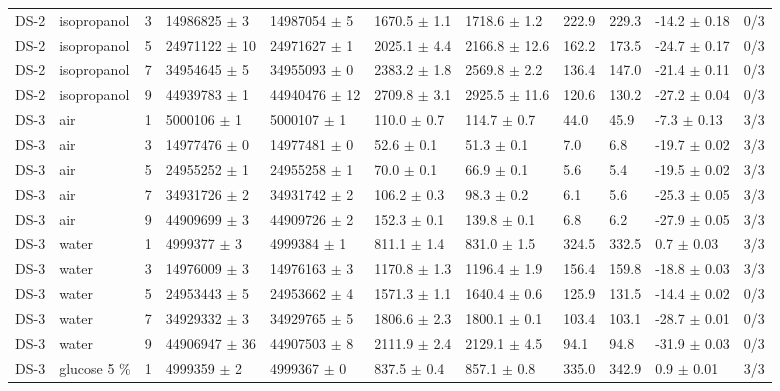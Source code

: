 \documentclass[11pt,a4paper]{article}
\begin{document}
\begin{landscape}
{\begin{longtable}{@{}lllllllllll@{}}
DS-2 & isopropanol & 3 & 14986825 $\pm$ 3 & 14987054 $\pm$ 5 & 1670.5 $\pm$ 1.1 & 1718.6 $\pm$ 1.2 & 222.9 & 229.3 & -14.2 $\pm$ 0.18 & 0/3 \\
DS-2 & isopropanol & 5 & 24971122 $\pm$ 10 & 24971627 $\pm$ 1 & 2025.1 $\pm$ 4.4 & 2166.8 $\pm$ 12.6 & 162.2 & 173.5 & -24.7 $\pm$ 0.17 & 0/3 \\
DS-2 & isopropanol & 7 & 34954645 $\pm$ 5 & 34955093 $\pm$ 0 & 2383.2 $\pm$ 1.8 & 2569.8 $\pm$ 2.2 & 136.4 & 147.0 & -21.4 $\pm$ 0.11 & 0/3 \\
DS-2 & isopropanol & 9 & 44939783 $\pm$ 1 & 44940476 $\pm$ 12 & 2709.8 $\pm$ 3.1 & 2925.5 $\pm$ 11.6 & 120.6 & 130.2 & -27.2 $\pm$ 0.04 & 0/3 \\
DS-3 & air & 1 & 5000106 $\pm$ 1 & 5000107 $\pm$ 1 & 110.0 $\pm$ 0.7 & 114.7 $\pm$ 0.7 & 44.0 & 45.9 & -7.3 $\pm$ 0.13 & 3/3 \\
DS-3 & air & 3 & 14977476 $\pm$ 0 & 14977481 $\pm$ 0 & 52.6 $\pm$ 0.1 & 51.3 $\pm$ 0.1 & 7.0 & 6.8 & -19.7 $\pm$ 0.02 & 3/3 \\
DS-3 & air & 5 & 24955252 $\pm$ 1 & 24955258 $\pm$ 1 & 70.0 $\pm$ 0.1 & 66.9 $\pm$ 0.1 & 5.6 & 5.4 & -19.5 $\pm$ 0.02 & 3/3 \\
DS-3 & air & 7 & 34931726 $\pm$ 2 & 34931742 $\pm$ 2 & 106.2 $\pm$ 0.3 & 98.3 $\pm$ 0.2 & 6.1 & 5.6 & -25.3 $\pm$ 0.05 & 3/3 \\
DS-3 & air & 9 & 44909699 $\pm$ 3 & 44909726 $\pm$ 2 & 152.3 $\pm$ 0.1 & 139.8 $\pm$ 0.1 & 6.8 & 6.2 & -27.9 $\pm$ 0.05 & 3/3 \\
DS-3 & water & 1 & 4999377 $\pm$ 3 & 4999384 $\pm$ 1 & 811.1 $\pm$ 1.4 & 831.0 $\pm$ 1.5 & 324.5 & 332.5 & 0.7 $\pm$ 0.03 & 3/3 \\
DS-3 & water & 3 & 14976009 $\pm$ 3 & 14976163 $\pm$ 3 & 1170.8 $\pm$ 1.3 & 1196.4 $\pm$ 1.9 & 156.4 & 159.8 & -18.8 $\pm$ 0.03 & 3/3 \\
DS-3 & water & 5 & 24953443 $\pm$ 5 & 24953662 $\pm$ 4 & 1571.3 $\pm$ 1.1 & 1640.4 $\pm$ 0.6 & 125.9 & 131.5 & -14.4 $\pm$ 0.02 & 0/3 \\
DS-3 & water & 7 & 34929332 $\pm$ 3 & 34929765 $\pm$ 5 & 1806.6 $\pm$ 2.3 & 1800.1 $\pm$ 0.1 & 103.4 & 103.1 & -28.7 $\pm$ 0.01 & 0/3 \\
DS-3 & water & 9 & 44906947 $\pm$ 36 & 44907503 $\pm$ 8 & 2111.9 $\pm$ 2.4 & 2129.1 $\pm$ 4.5 & 94.1 & 94.8 & -31.9 $\pm$ 0.03 & 0/3 \\
DS-3 & glucose 5 \% & 1 & 4999359 $\pm$ 2 & 4999367 $\pm$ 0 & 837.5 $\pm$ 0.4 & 857.1 $\pm$ 0.8 & 335.0 & 342.9 & 0.9 $\pm$ 0.01 & 3/3 \\

\end{longtable}}
\end{landscape}
\end{document}

